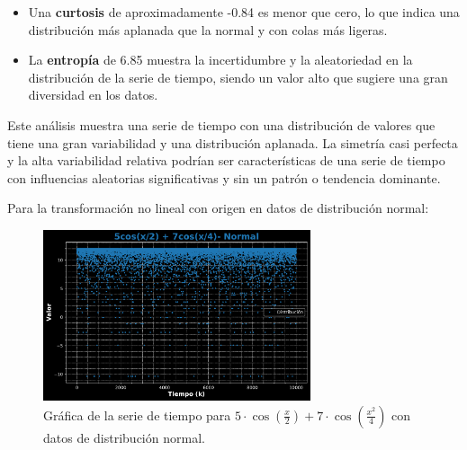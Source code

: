 \documentclass[11pt]{article} %
\begin{document}
\begin{itemize}
		\item Una \textbf{curtosis} de aproximadamente -0.84 es menor que cero, lo que indica una distribución más aplanada que la normal y con colas más ligeras.
		
		\item La \textbf{entropía} de 6.85 muestra la incertidumbre y la aleatoriedad en la distribución de la serie de tiempo, siendo un valor alto que sugiere una gran diversidad en los datos.
	\end{itemize}
	
	Este análisis muestra una serie de tiempo con una distribución de valores que tiene una gran variabilidad y una distribución aplanada. La simetría casi perfecta y la alta variabilidad relativa podrían ser características de una serie de tiempo con influencias aleatorias significativas y sin un patrón o tendencia dominante.
	
	\newpage
	
	Para la transformación no lineal con origen en datos de distribución normal:
	\begin{figure}[h]
		\centering
		\includegraphics[width=0.7\textwidth]{../transformaciones/per_normal1.pdf}
		\caption{Gráfica de la serie de tiempo para \( 5\cdot \cos\left(\frac{x}{2}\right) + 7\cdot \cos\left(\frac{x^2}{4}\right) \) con datos de distribución normal.}
		\label{fig:perNormGraf}
	\end{figure}
	
\end{document}
